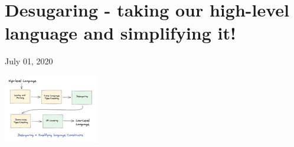 %
%
%
%
%
%

\hypertarget{top-of-page}{%
\chapter{Desugaring - taking our high-level language and simplifying
it!}\label{top-of-page}}

July 01, 2020

%

\includegraphics[width=\linewidth]{06_files/desugaring.png}

